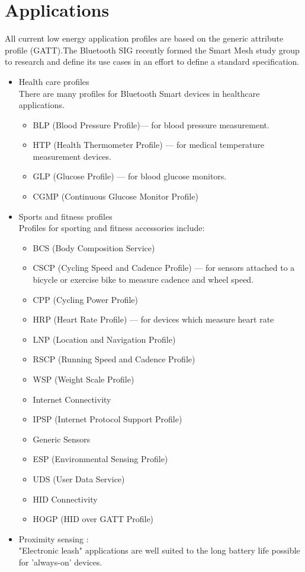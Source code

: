 \documentclass[11pt,a4paper]{article}
\begin{document}
	\section{Applications}
	{
    All current low energy application profiles are based on the generic attribute profile (GATT).The Bluetooth SIG recently formed the Smart Mesh study group to research and define its use cases in an effort to define a standard specification.
    \begin{itemize}
 \item   Health care profiles\\
There are many profiles for Bluetooth Smart devices in healthcare applications.
\begin{itemize}
\item BLP (Blood Pressure Profile)— for blood pressure measurement.
\item HTP (Health Thermometer Profile) — for medical temperature measurement devices.
\item GLP (Glucose Profile) — for blood glucose monitors.
\item CGMP (Continuous Glucose Monitor Profile)
\end{itemize}
\item Sports and fitness profiles\\
Profiles for sporting and fitness accessories include:
\begin{itemize}
\item BCS (Body Composition Service)
\item CSCP (Cycling Speed and Cadence Profile) — for sensors attached to a bicycle or exercise bike to measure cadence and wheel speed.
\item CPP (Cycling Power Profile)
\item HRP (Heart Rate Profile) — for devices which measure heart rate
\item LNP (Location and Navigation Profile)
\item RSCP (Running Speed and Cadence Profile)
\item WSP (Weight Scale Profile)
\end{itemize}
\begin{itemize}
\item Internet Connectivity
\item IPSP (Internet Protocol Support Profile)
\end{itemize}
\begin{itemize}
\item Generic Sensors
\item ESP (Environmental Sensing Profile)
\item UDS (User Data Service)
\end{itemize}
\begin{itemize}
\item HID Connectivity
\item HOGP (HID over GATT Profile)
\end{itemize}
\item Proximity sensing :\\
"Electronic leash" applications are well suited to the long battery life possible for 'always-on' devices.


\end{itemize}}
\end{document}

